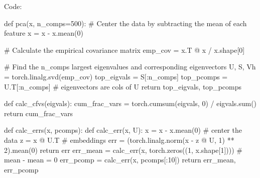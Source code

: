 \documentclass[submit]{harvardml}
\begin{document}
Code:

\begin{python}
def pca(x, n_comps=500):
    # Center the data by subtracting the mean of each feature
    x = x - x.mean(0)

    # Calculate the empirical covariance matrix
    emp_cov = x.T @ x / x.shape[0]

    # Find the n_comps largest eigenvalues and corresponding eigenvectors
    U, S, Vh = torch.linalg.svd(emp_cov)
    top_eigvals = S[:n_comps]
    top_pcomps = U.T[:n_comps] # eigenvectors are cols of U
    return top_eigvals, top_pcomps


def calc_cfvs(eigvals):
    cum_frac_vars = torch.cumsum(eigvals, 0) / eigvals.sum()
    return cum_frac_vars


def calc_errs(x, pcomps):
    def calc_err(x, U):
        x = x - x.mean(0) # center the data
        z = x @ U.T # embeddings
        err = (torch.linalg.norm(x - z @ U, 1) ** 2).mean(0)
        return err
    err_mean = calc_err(x, torch.zeros((1, x.shape[1]))) # mean - mean = 0
    err_pcomp = calc_err(x, pcomps[:10])
    return err_mean, err_pcomp
\end{python}
\end{document}
